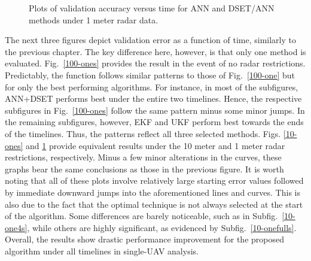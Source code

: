 \documentclass[12pt]{uthesis-v12}  %
\begin{document}
\begin{figure}
	\hfill	
{}
						
\caption{Plots of validation accuracy versus time for ANN and DSET/ANN methods under 1 meter radar data.}
	\label{1-ones}
	\end{figure}	
	
The next three figures depict validation error as a function of time, similarly to the previous chapter. The key difference here, however, is that only one method is evaluated. Fig.~\ref{100-ones} provides the result in the event of no radar restrictions. Predictably, the function follows similar patterns to those of Fig.~\ref{100-one} but for only the best performing algorithms. For instance, in most of the subfigures, ANN+DSET performs best under the entire two timelines. Hence, the respective subfigures in Fig.~\ref{100-ones} follow the same pattern minus some minor jumps. In the remaining subfigures, however, EKF and UKF perform best towards the ends of the timelines. Thus, the patterns reflect all three selected methods. Figs. \ref{10-ones} and \ref{1-ones} provide equivalent results under the 10 meter and 1 meter radar restrictions, respectively. Minus a few minor alterations in the curves, these graphs bear the same conclusions as those in the previous figure. It is worth noting that all of these plots involve relatively large starting error values followed by immediate downward jumps into the aforementioned lines and curves. This is also due to the fact that the optimal technique is not always selected at the start of the algorithm. Some differences are barely noticeable, such as in Subfig.~\ref{10-one4s}, while others are highly significant, as evidenced by Subfig.~\ref{10-onefulls}. Overall, the results show drastic performance improvement for the proposed algorithm under all timelines in single-UAV analysis.
\end{document}
